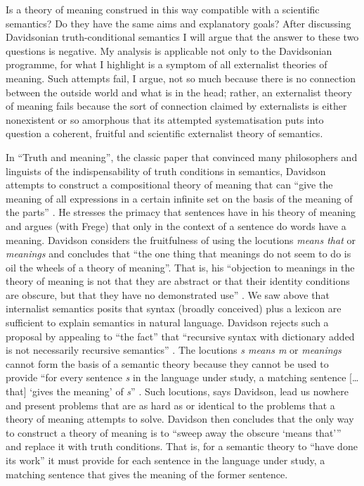 Is a theory of meaning construed in this way compatible with a scientific semantics? Do they have the same aims and explanatory goals? After discussing Davidsonian truth-conditional semantics I will argue that the answer to these two questions is negative. My analysis is applicable not only to the Davidsonian programme, for what I highlight is a symptom of all externalist theories of meaning. Such attempts fail, I argue, not so much because there is no connection between the outside world and what is in the head; rather, an externalist theory of meaning fails because the sort of connection claimed by externalists is either nonexistent or so amorphous that its attempted systematisation puts into question a coherent, fruitful and scientific externalist theory of semantics.

In “Truth and meaning”, the classic paper that convinced many philosophers and linguists of the indispensability of truth conditions in semantics, Davidson attempts to construct a compositional theory of meaning that can “give the meaning of all expressions in a certain infinite set on the basis of the meaning of the parts” \citep[305]{Davidson1967}. He stresses the primacy that sentences have in his theory of meaning and argues (with Frege) that only in the context of a sentence do words have a meaning. Davidson considers the fruitfulness of using the locutions \textit{means that} or \textit{meanings} and concludes that “the one thing that meanings do not seem to do is oil the wheels of a theory of meaning”. That is, his “objection to meanings in the theory of meaning is not that they are abstract or that their identity conditions are obscure, but that they have no demonstrated use” \citep[307]{Davidson1967}. We saw above that internalist semantics posits that syntax (broadly conceived) plus a lexicon are sufficient to explain semantics in natural language. Davidson rejects such a proposal by appealing to “the fact” that “recursive syntax with dictionary added is not necessarily recursive semantics” \citep[308]{Davidson1967}. The locutions \textit{s means m} or \textit{meanings} cannot form the basis of a semantic theory because they cannot be used to provide “for every sentence \textit{s} in the language under study, a matching sentence [… that] ‘gives the meaning’ of \textit{s}” \citep[309]{Davidson1967}. Such locutions, says Davidson, lead us nowhere and present problems that are as hard as or identical to the problems that a theory of meaning attempts to solve. Davidson then concludes that the only way to construct a theory of meaning is to “sweep away the obscure ‘means that’” and replace it with truth conditions. That is, for a semantic theory to “have done its work” it must provide for each sentence in the language under study, a matching sentence that gives the meaning of the former sentence.

